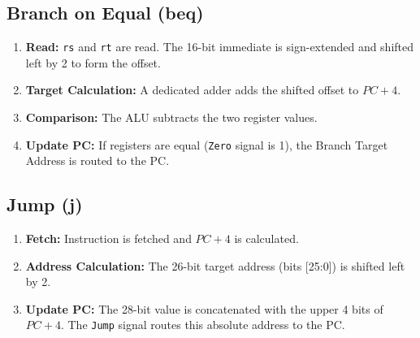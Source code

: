 \subsection{Branch on Equal (beq)}

\begin{enumerate}
    \item \textbf{Read:} \texttt{rs} and \texttt{rt} are read. The 16-bit immediate is sign-extended and shifted left by 2 to form the offset.
    \item \textbf{Target Calculation:} A dedicated adder adds the shifted offset to $PC + 4$.
    \item \textbf{Comparison:} The ALU subtracts the two register values.
    \item \textbf{Update PC:} If registers are equal (\texttt{Zero} signal is 1), the Branch Target Address is routed to the PC.
\end{enumerate}

\subsection{Jump (j)}

\begin{enumerate}
    \item \textbf{Fetch:} Instruction is fetched and $PC + 4$ is calculated.
    \item \textbf{Address Calculation:} The 26-bit target address (bits [25:0]) is shifted left by 2.
    \item \textbf{Update PC:} The 28-bit value is concatenated with the upper 4 bits of $PC + 4$. The \texttt{Jump} signal routes this absolute address to the PC.
\end{enumerate}
